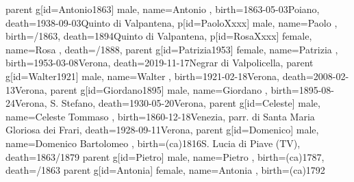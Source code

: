 \documentclass{article}
\begin{document}
\begin{midpage}
\begin{center}
\begin{genealogypicture}
{{{{{                }
            }
            parent{
                g[id=Antonio1863]{
                    male,
                    name={Antonio },
                    birth={1863-05-03}{Poiano},
                    death={1938-09-03}{Quinto di Valpantena},
                }
                p[id=PaoloXxxx]{
                    male,
                    name={Paolo },
                    birth={/1863}{},
                    death={1894}{Quinto di Valpantena},
                }
                p[id=RosaXxxx]{
                    female,
                    name={Rosa },
                    death={/1888}{},
                }
            }
        }
    }
    parent{
        g[id=Patrizia1953]{
            female,
            name={Patrizia },
            birth={1953-03-08}{Verona},
            death={2019-11-17}{Negrar di Valpolicella},
        }
        parent{
            g[id=Walter1921]{
                male,
                name={Walter },
                birth={1921-02-18}{Verona},
                death={2008-02-13}{Verona},
            }
            parent{
                g[id=Giordano1895]{
                    male,
                    name={Giordano },
                    birth={1895-08-24}{Verona, S. Stefano},
                    death={1930-05-20}{Verona},
                }
                parent{
                    g[id=Celeste]{
                        male,
                        name={Celeste Tommaso },
                        birth={1860-12-18}{Venezia, parr. di Santa Maria Gloriosa dei Frari},
                        death={1928-09-11}{Verona},
                    }
                    parent{
                        g[id=Domenico]{
                            male,
                            name={Domenico Bartolomeo },
                            birth={(ca)1816}{S. Lucia di Piave (TV)},
                            death={1863/1879}{}
                        }
                        parent{
                            g[id=Pietro]{
                                male,
                                name={Pietro },
                                birth={(ca)1787}{},
                                death={/1863}{}
                            }
                        }
                        parent{
                            g[id=Antonia]{
                                female,
                                name={Antonia },
                                birth={(ca)1792}{}
}}}}}}}}
\end{genealogypicture}
\end{center}
\end{midpage}
\end{document}
